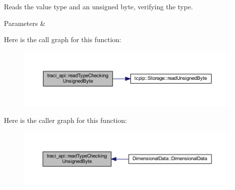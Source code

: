 Reads the value type and an unsigned byte, verifying the type. 


\begin{DoxyParams}{Parameters}
{\em } & \\
\hline
\end{DoxyParams}
Here is the call graph for this function\+:
\nopagebreak
\begin{figure}[H]
\begin{center}
\leavevmode
\includegraphics[width=350pt]{namespacetraci__api_ac95893093cb3b220faafd74ce62abba3_cgraph}
\end{center}
\end{figure}
Here is the caller graph for this function\+:
\nopagebreak
\begin{figure}[H]
\begin{center}
\leavevmode
\includegraphics[width=350pt]{namespacetraci__api_ac95893093cb3b220faafd74ce62abba3_icgraph}
\end{center}
\end{figure}
